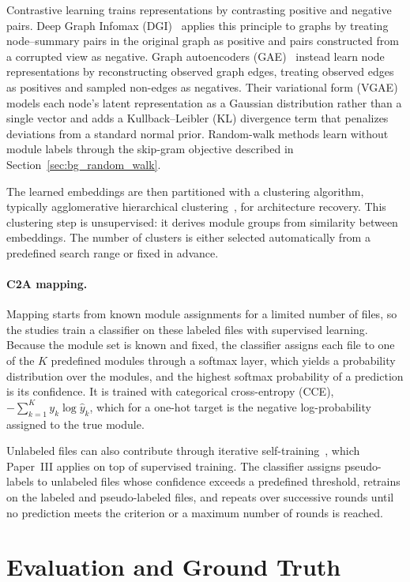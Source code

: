 Contrastive learning trains representations by contrasting positive and negative pairs. Deep Graph Infomax (DGI)~\cite{dgi} applies this principle to graphs by treating node--summary pairs in the original graph as positive and pairs constructed from a corrupted view as negative. Graph autoencoders (GAE)~\cite{gae} instead learn node representations by reconstructing observed graph edges, treating observed edges as positives and sampled non-edges as negatives. Their variational form (VGAE)~\cite{gae} models each node's latent representation as a Gaussian distribution rather than a single vector and adds a Kullback--Leibler (KL) divergence term that penalizes deviations from a standard normal prior. Random-walk methods learn without module labels through the skip-gram objective described in Section~\ref{sec:bg_random_walk}.

The learned embeddings are then partitioned with a clustering algorithm, typically agglomerative hierarchical clustering~\cite{agglomerative}, for architecture recovery. This clustering step is unsupervised: it derives module groups from similarity between embeddings. The number of clusters is either selected automatically from a predefined search range or fixed in advance.

\paragraph{C2A mapping.} Mapping starts from known module assignments for a limited number of files, so the studies train a classifier on these labeled files with supervised learning. Because the module set is known and fixed, the classifier assigns each file to one of the $K$ predefined modules through a softmax layer, which yields a probability distribution over the modules, and the highest softmax probability of a prediction is its confidence. It is trained with categorical cross-entropy (CCE), $-\sum_{k=1}^{K} y_k\log\hat{y}_k$, which for a one-hot target is the negative log-probability assigned to the true module.

Unlabeled files can also contribute through iterative self-training~\cite{lee2013pseudo}, which Paper~III applies on top of supervised training. The classifier assigns pseudo-labels to unlabeled files whose confidence exceeds a predefined threshold, retrains on the labeled and pseudo-labeled files, and repeats over successive rounds until no prediction meets the criterion or a maximum number of rounds is reached.

\section[Evaluation and Ground Truth]{Evaluation and Ground Truth}
\label{sec:bg-eval}

